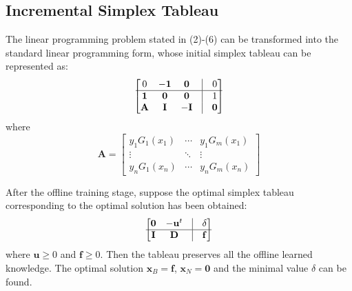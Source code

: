 \documentclass[letterpaper]{article}
\begin{document}
\subsection{Incremental Simplex Tableau}

The linear programming problem stated in (2)-(6) can be transformed into the standard linear programming form,
whose initial simplex tableau can be represented as:
\begin{equation}
\begin{bmatrix}
0 & -\mathbf{1} & \mathbf{0} & \vline & 0  \\
\hline
\mathbf{1} & \mathbf{0} & \mathbf{0} & \vline & 1 \\
\mathbf{A} & \mathbf{I} & -\mathbf{I} & \vline & \mathbf{0}
\end{bmatrix}
\end{equation}
where
\begin{equation}
\mathbf{A} =
\begin{bmatrix}
y_1G_1(x_1) & \cdots & y_1G_m(x_1) \\
\vdots & \ddots & \vdots \\
y_nG_1(x_n) & \cdots & y_nG_m(x_n)
\end{bmatrix}
\end{equation}

After the offline training stage, suppose the optimal simplex tableau corresponding to the optimal solution has been obtained:
\begin{equation}
\begin{bmatrix}
\mathbf{0} & -\mathbf{u}^t & \vline & \mathbf{\delta} \\
\hline
\mathbf{I} & \mathbf{D} & \vline & \mathbf{f}
\end{bmatrix}
\end{equation}
where $\mathbf{u} \geq 0$ and $\mathbf{f} \geq 0$. Then the tableau preserves all the offline learned knowledge. The optimal solution $\mathbf{x}_B = \mathbf{f}$, $\mathbf{x}_N = \mathbf{0}$ and the minimal value $\delta$ can be found.
\end{document}
